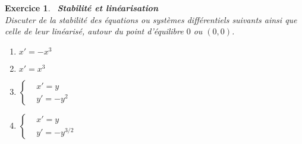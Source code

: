\documentclass[11pt]{article}
\theoremstyle{exostyle}
\newtheorem{exercice}{Exercice}
\begin{document}
\newpage
\begin{exercice}~{\bf  Stabilité et linéarisation}~\\
Discuter de la stabilité des équations ou systèmes différentiels suivants ainsi que celle de leur linéarisé, autour du point d'équilibre $0$ ou $(0,0)$.  \\

\begin{enumerate}
\item $x'= -x^3$ 
\item $x'=  x^3$  
\item 
$ \left\{ \begin{aligned}
 &x'=y \\
 & y'=-y^2
\end{aligned} \right.
$
\item 
$ \left\{  \begin{aligned}
 &x'=y \\
 & y'=-y^{3/2}
\end{aligned}
 \right.
$
 \end{enumerate} 
\end{exercice}
\medskip
\end{document}
